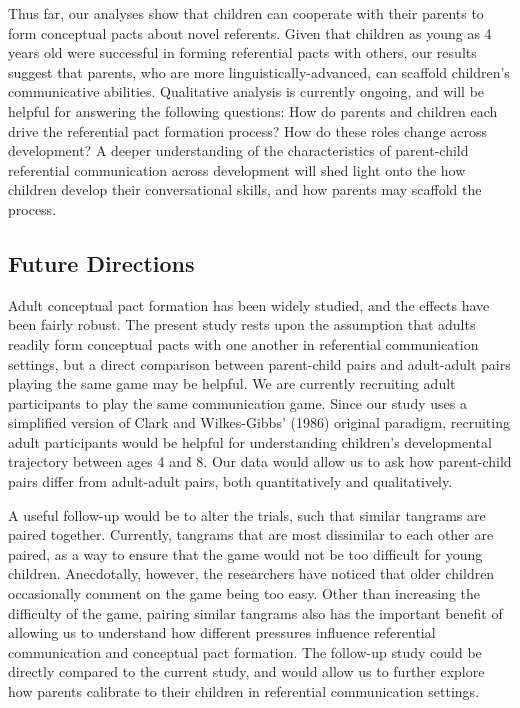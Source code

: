 \documentclass[10pt, letterpaper]{article}
\begin{document}
Thus far, our analyses show that children can cooperate with their
parents to form conceptual pacts about novel referents. Given that
children as young as 4 years old were successful in forming referential
pacts with others, our results suggest that parents, who are more
linguistically-advanced, can scaffold children's communicative
abilities. Qualitative analysis is currently ongoing, and will be
helpful for answering the following questions: How do parents and
children each drive the referential pact formation process? How do these
roles change across development? A deeper understanding of the
characteristics of parent-child referential communication across
development will shed light onto the how children develop their
conversational skills, and how parents may scaffold the process.

\hypertarget{future-directions}{%
\subsection{Future Directions}\label{future-directions}}

Adult conceptual pact formation has been widely studied, and the effects
have been fairly robust. The present study rests upon the assumption
that adults readily form conceptual pacts with one another in
referential communication settings, but a direct comparison between
parent-child pairs and adult-adult pairs playing the same game may be
helpful. We are currently recruiting adult participants to play the same
communication game. Since our study uses a simplified version of Clark
and Wilkes-Gibbs' (1986) original paradigm, recruiting adult
participants would be helpful for understanding children's developmental
trajectory between ages 4 and 8. Our data would allow us to ask how
parent-child pairs differ from adult-adult pairs, both quantitatively
and qualitatively.

A useful follow-up would be to alter the trials, such that similar
tangrams are paired together. Currently, tangrams that are most
dissimilar to each other are paired, as a way to ensure that the game
would not be too difficult for young children. Anecdotally, however, the
researchers have noticed that older children occasionally comment on the
game being too easy. Other than increasing the difficulty of the game,
pairing similar tangrams also has the important benefit of allowing us
to understand how different pressures influence referential
communication and conceptual pact formation. The follow-up study could
be directly compared to the current study, and would allow us to further
explore how parents calibrate to their children in referential
communication settings.
\end{document}
